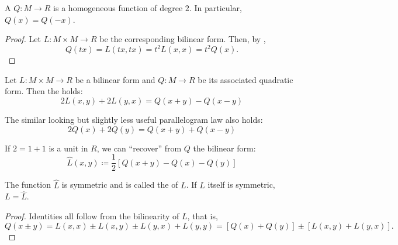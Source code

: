 \begin{proposition}\label{thm:bilinear_forms_vs_to_quadratic_forms}
  A  \( Q: M \to R \) is a homogeneous function of degree \( 2 \). In particular, \( Q(x) = Q(-x) \).
\end{proposition}
\begin{proof}
  Let \( L: M \times M \to R \) be the corresponding bilinear form. Then, by ,
  \begin{equation*}
    Q(tx) = L(tx, tx) = t^2 L(x, x) = t^2 Q(x).
  \end{equation*}
\end{proof}

\begin{proposition}\label{thm:polarization_identity}\cite{nLab:polarization_identity}
  Let \( L: M \times M \to R \) be a bilinear form and \( Q: M \to R \) be its associated quadratic form. Then the  holds:
  \begin{equation}\label{thm:polarization_identity/polarization_identity}
    2 L(x, y) + 2 L(y, x) = Q(x + y) - Q(x - y)
  \end{equation}

  The similar looking but slightly less useful parallelogram law also holds:
  \begin{equation}\label{thm:polarization_identity/parallelogram_law}
    2 Q(x) + 2 Q(y) = Q(x + y) + Q(x - y)
  \end{equation}

  If \( 2 = 1 + 1 \) is a unit in \( R \), we can \enquote{recover} from \( Q \) the bilinear form:
  \begin{equation}\label{thm:polarization_identity/symmetrization_definition}
    \hat L(x, y) \coloneqq \frac 1 2 \left[ Q(x + y) - Q(x) - Q(y) \right]
  \end{equation}

  The function \( \hat L \) is symmetric and is called the  of \( L \). If \( L \) itself is symmetric, \( L = \hat L \).
\end{proposition}
\begin{proof}
  Identities  all follow from the bilinearity of \( L \), that is,
  \begin{equation*}
    Q(x \pm y)
    =
    L(x, x) \pm L(x, y) \pm L(y, x) + L(y, y)
    =
    [Q(x) + Q(y)] \pm [L(x, y) + L(y, x)].
  \end{equation*}
\end{proof}


